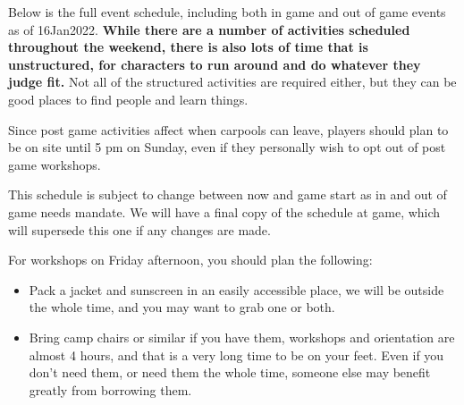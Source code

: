 \documentclass[green]{GL2020}
\begin{document}
\name{\gWeekendSchedule{}}

Below is the full event schedule, including both in game and out of game events as of 16Jan2022. \textbf{While there are a number of activities scheduled throughout the weekend, there is also lots of time that is unstructured, for characters to run around and do whatever they judge fit.} Not all of the structured activities are required either, but they can be good places to find people and learn things.

Since post game activities affect when carpools can leave, players should plan to be on site until 5 pm on Sunday, even if they personally wish to opt out of post game workshops.

This schedule is subject to change between now and game start as in and out of game needs mandate. We will have a final copy of the schedule at game, which will supersede this one if any changes are made.


For workshops on Friday afternoon, you should plan the following:
\begin{itemize}
	\item Pack a jacket and sunscreen in an easily accessible place, we will be outside the whole time, and you may want to grab one or both.
	\item Bring camp chairs or similar if you have them, workshops and orientation are almost 4 hours, and that is a very long time to be on your feet. Even if you don’t need them, or need them the whole time, someone else may benefit greatly from borrowing them.
\end{itemize}
\end{document}
